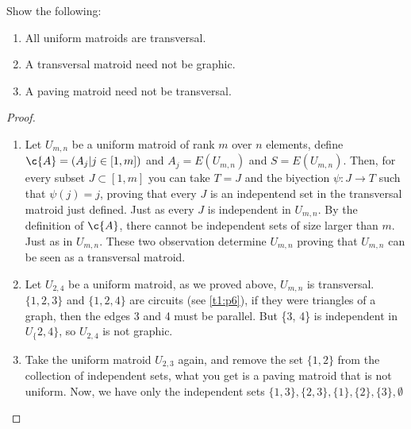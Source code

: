 \prob
{
    Show the following:
    \begin{enumerate}[label=(\roman*)]
        \item   All uniform matroids are transversal.
        \item   A transversal matroid need not be graphic.
        \item   A paving matroid need not be transversal.
    \end{enumerate}
}
\begin{proof}
    \begin{enumerate}[label=(\roman*)]
        \item   Let $U_{m, n}$ be a uniform matroid of rank $m$ over $n$ elements,  define $\c{A} = (A_j | j \in [1, m])$ 
                and $A_j = E(U_{m,n})$ and $S = E(U_{m,n})$. Then, for every subset $J \subset [1, m]$ you can take $T = J$ and the biyection
                $\psi : J \rightarrow T$ such that $\psi(j) = j$, proving that every $J$ is an indepentend set in the transversal
                matroid just defined. Just as every $J$ is independent in $U_{m, n}$. By the definition of $\c{A}$, there cannot be
                independent sets of size larger than $m$. Just as in $U_{m, n}$. These two observation determine $U_{m, n}$ proving that
                $U_{m, n}$ can be seen as a transversal matroid.\pn
                
        \item   Let $U_{2, 4}$ be a uniform matroid, as we proved above, $U_{m, n}$ is transversal. $\{1, 2, 3\}$ and $\{1, 2, 4\}$ are circuits
                (see \ref{t1:p6}), if they were triangles of a graph, then the edges 3 and 4 must be parallel. But \{3, 4\} is independent in $U_\{2, 4\}$,
                so $U_{2, 4}$ is not graphic.\pn

        \item   Take the uniform matroid $U_{2, 3}$ again, and remove the set $\{1, 2\}$ from the collection of independent sets, what you
                get is a paving matroid that is not uniform. Now, we have only the independent sets $\{1, 3\}, \{2, 3\}, \{1\}, \{2\}, \{3\}, \emptyset$
    \end{enumerate}
\end{proof}